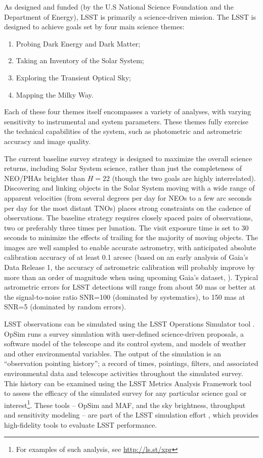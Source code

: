 As designed and funded (by the U.S National Science Foundation and
the Department of Energy), LSST is primarily a science-driven mission.
The LSST is designed to achieve goals set by four main science themes:
\begin{enumerate}
\item Probing Dark Energy and Dark Matter;
\item Taking an Inventory of the Solar System;
\item Exploring the Transient Optical Sky;
\item Mapping the Milky Way.
\end{enumerate}
Each of these four themes itself encompasses a variety of analyses, with
varying sensitivity to instrumental and system parameters. These themes
fully exercise the technical capabilities of the system, such as photometric
and astrometric accuracy and image quality.

The current baseline survey strategy is designed to maximize the overall science returns, including
Solar System science, rather than just the completeness of NEO/PHAs brighter than $H=22$ (though the
two goals are highly interrelated). Discovering and linking objects in the Solar System
moving with a wide range of apparent velocities (from several degrees per day for
NEOs to a few arc seconds per day for the most distant TNOs) places strong
constraints on the cadence of observations. The baseline strategy requires closely
spaced pairs of observations, two or preferably three times per lunation. The visit
exposure time is set to 30 seconds to minimize the effects of trailing for the majority of
moving objects. The images are well sampled to enable accurate astrometry, with
anticipated absolute calibration accuracy of at least 0.1 arcsec (based on an early analysis 
of Gaia's Data Release 1, the accuracy of astrometric calibration will probably improve 
by more than an order of magnitude when using upcoming Gaia's dataset, \citealt{Gaia}).
Typical astrometric errors for LSST detections will range from about 50 mas or better
at the signal-to-noise ratio SNR=100 (dominated by systematics), to 150 mas at SNR=5
(dominated by random errors). 

LSST observations can be simulated using the LSST Operations Simulator tool
\citep[OpSim,][]{delgado14}. OpSim runs a survey simulation with user-defined
science-driven proposals, a software model of the telescope and its control
system, and models of weather and other environmental variables. The output of
the simulation is an ``observation pointing history''; a record of times,
pointings, filters, and associated environmental data and telescope
activities throughout the simulated survey.  This history can be examined using
the LSST Metrics Analysis Framework tool \citep[MAF,][]{jones14} to assess the
efficacy of the simulated survey for any particular science goal or
interest\footnote{For examples of such analysis, see \url{http://ls.st/xpr}}. These
tools -- OpSim and MAF, and the sky brightness, throughput and sensitivity modeling --
are part of the LSST simulation effort \citep{LSSTSimsOverview}, which provides high-fidelity
tools to evaluate LSST performance.


